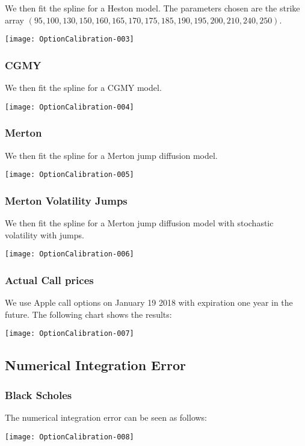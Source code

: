 \documentclass{article}
\begin{document}
We then fit the spline for a Heston model.  The parameters chosen are the strike array \((95,100,130,150,160,165,170,175,185,190,195,200,210,240,250)\).

\texttt{[image: OptionCalibration-003]}


\subsubsection{CGMY}

We then fit the spline for a CGMY model.

\texttt{[image: OptionCalibration-004]}

\subsubsection{Merton}

We then fit the spline for a Merton jump diffusion model.

\texttt{[image: OptionCalibration-005]}

\subsubsection{Merton Volatility Jumps}

We then fit the spline for a Merton jump diffusion model with stochastic volatility with jumps.

\texttt{[image: OptionCalibration-006]}

\subsubsection{Actual Call prices}

We use Apple call options on January 19 2018 with expiration one year in the future.  The following chart shows the results:

\texttt{[image: OptionCalibration-007]}

\subsection{Numerical Integration Error}

\subsubsection{Black Scholes}
The numerical integration error can be seen as follows:

\texttt{[image: OptionCalibration-008]}
\end{document}
